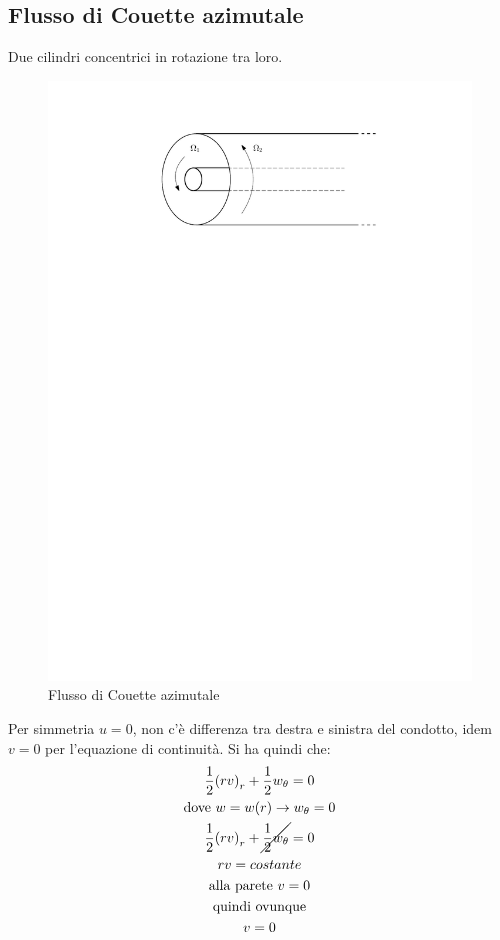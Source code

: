 \subsection{Flusso di Couette azimutale}
 Due cilindri concentrici in rotazione tra loro.
	\begin{figure}[ht]
		\includegraphics[scale=0.8]{./3.6 Soluzioni esatte equazioni di Navier-Stokes/3.6-5}
		\centering
		\caption{Flusso di Couette azimutale}
	\end{figure}
%
Per simmetria $u = 0$, non c'è differenza tra destra e sinistra del condotto, idem $v = 0$ per l'equazione di continuità.
Si ha quindi che:
	\begin{equation*}
		\begin{gathered}
			\frac{1}{2} {(rv)}_r + \frac{1}{2} w_{\theta} = 0\\
			\text{dove } w = w(r) \rightarrow w_\theta = 0\\
			\frac{1}{2} {(rv)}_r + \cancel{\frac{1}{2} w_{\theta}} = 0\\
			rv = costante\\
			\text{alla parete } v = 0\\
			\text{quindi ovunque}\\
			v = 0
		\end{gathered}
	\end{equation*}

